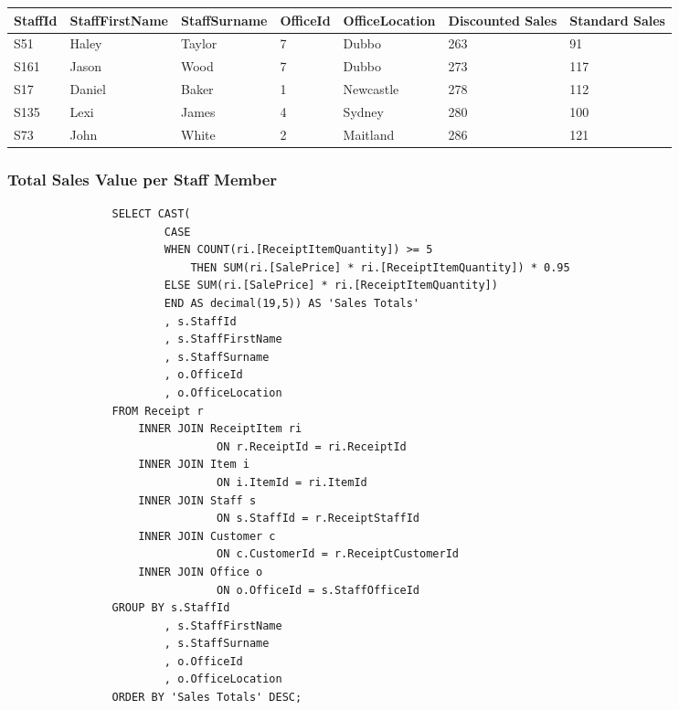 \documentclass{article}
\begin{document}
            \begin{table}[H]
                \centering
                \begin{tabular}{|l|l|l|l|l|l|l|}
                \hline
                StaffId & StaffFirstName & StaffSurname & OfficeId & OfficeLocation & Discounted Sales & Standard Sales \\ \hline
                S51     & Haley          & Taylor       & 7        & Dubbo          & 263              & 91             \\ \hline
                S161    & Jason          & Wood         & 7        & Dubbo          & 273              & 117            \\ \hline
                S17     & Daniel         & Baker        & 1        & Newcastle      & 278              & 112            \\ \hline
                S135    & Lexi           & James        & 4        & Sydney         & 280              & 100            \\ \hline
                S73     & John           & White        & 2        & Maitland       & 286              & 121            \\ \hline
                \end{tabular}
                \end{table}


\newpage

            \subsubsection{Total Sales Value per Staff Member}


            \begin{lstlisting}
				SELECT CAST(
						CASE
						WHEN COUNT(ri.[ReceiptItemQuantity]) >= 5
							THEN SUM(ri.[SalePrice] * ri.[ReceiptItemQuantity]) * 0.95
						ELSE SUM(ri.[SalePrice] * ri.[ReceiptItemQuantity])
						END AS decimal(19,5)) AS 'Sales Totals'
						, s.StaffId
						, s.StaffFirstName
						, s.StaffSurname
						, o.OfficeId
						, o.OfficeLocation
				FROM Receipt r
					INNER JOIN ReceiptItem ri
								ON r.ReceiptId = ri.ReceiptId
					INNER JOIN Item i
								ON i.ItemId = ri.ItemId
					INNER JOIN Staff s
								ON s.StaffId = r.ReceiptStaffId
					INNER JOIN Customer c
								ON c.CustomerId = r.ReceiptCustomerId
					INNER JOIN Office o
								ON o.OfficeId = s.StaffOfficeId
				GROUP BY s.StaffId
						, s.StaffFirstName
						, s.StaffSurname
						, o.OfficeId
						, o.OfficeLocation
				ORDER BY 'Sales Totals' DESC;
            \end{lstlisting}
\end{document}
